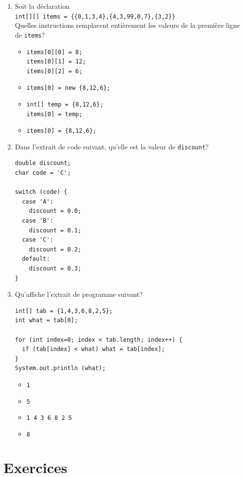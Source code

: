 \documentclass[11pt,a4paper]{article}
\newcommand{\boxitem}{\item[$\Box$]}
\begin{document}
\begin{enumerate}
  \item Soit la déclaration\\
  \verb+int[][] items = {{0,1,3,4},{4,3,99,0,7},{3,2}}+\\
  Quelles instructions remplacent entièrement les valeurs de la
  première ligne de \texttt{items}?
  \begin{itemize}

      \boxitem
      \begin{verbatim}
items[0][0] = 8;
items[0][1] = 12;
items[0][2] = 6;
      \end{verbatim}
      \vspace*{-10pt}

      \boxitem \verb+items[0] = new {8,12,6};+

      \boxitem
      \begin{verbatim}
int[] temp = {8,12,6};
items[0] = temp;
      \end{verbatim}
      \vspace*{-10pt}

      \boxitem \verb+items[0] = {8,12,6};+
  \end{itemize}

  \item Dans l'extrait de code suivant, qu'elle est la valeur de
    \texttt{discount}?
    \begin{verbatim}
double discount;
char code = 'C';

switch (code) {
  case 'A':
    discount = 0.0;
  case 'B':
    discount = 0.1;
  case 'C':
    discount = 0.2;
  default:
    discount = 0.3;
}
    \end{verbatim}

  \item Qu'affiche l'extrait de programme suivant?
  \begin{verbatim}
int[] tab = {1,4,3,6,8,2,5};
int what = tab[0];

for (int index=0; index < tab.length; index++) {
  if (tab[index] < what) what = tab[index];
}
System.out.println (what);
  \end{verbatim}
  \vspace*{-10pt}
  \begin{itemize}
    \boxitem \verb+1+
    \boxitem \verb+5+
    \boxitem \verb+1 4 3 6 8 2 5+
    \boxitem \verb+8+
  \end{itemize}

\end{enumerate}


\section{Exercices}
\end{document}
